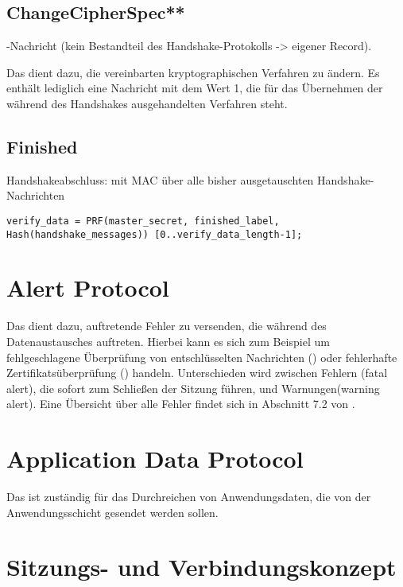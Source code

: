 \subsection*{ChangeCipherSpec**}

\changecipherspec{}-Nachricht (kein Bestandteil des Handshake-Protokolls -> eigener Record).

Das \changecipherspecprotocol{} dient dazu, die vereinbarten kryptographischen Verfahren zu ändern. Es enthält lediglich eine Nachricht mit dem Wert 1, die für das Übernehmen der während des Handshakes ausgehandelten Verfahren steht. 

\subsection*{Finished}

Handshakeabschluss: \finished{} mit MAC über alle bisher ausgetauschten Handshake-Nachrichten 
\begin{lstlisting}
verify_data = PRF(master_secret, finished_label, Hash(handshake_messages)) [0..verify_data_length-1];
\end{lstlisting}

\section{Alert Protocol}

Das \alertprotocol{} dient dazu, auftretende Fehler zu versenden, die während des Datenaustausches auftreten. Hierbei kann es sich zum Beispiel um fehlgeschlagene Überprüfung von entschlüsselten Nachrichten (\badrecordmac{}) oder fehlerhafte Zertifikatsüberprüfung (\badcertificate{}) handeln. Unterschieden wird zwischen Fehlern (fatal alert), die sofort zum Schließen der Sitzung führen, und Warnungen(warning alert). Eine Übersicht über alle Fehler findet sich in Abschnitt 7.2 von \cite{tls12}.

\section{Application Data Protocol}

Das \applicationdataprotocol{} ist zuständig für das Durchreichen von Anwendungsdaten, die von der Anwendungsschicht gesendet werden sollen.


\section{Sitzungs- und Verbindungskonzept}
\label{sec_session_connection}

